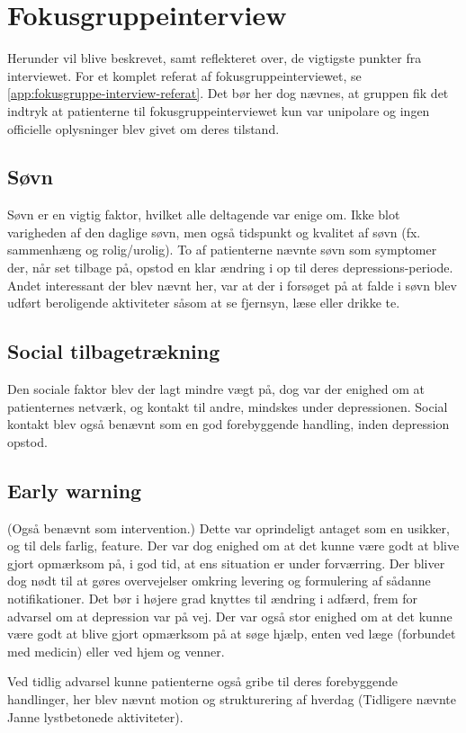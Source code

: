 \section{Fokusgruppeinterview}
Herunder vil blive beskrevet, samt reflekteret over, de vigtigste punkter fra interviewet.
For et komplet referat af fokusgruppeinterviewet, se \cref{app:fokusgruppe-interview-referat}.
Det bør her dog nævnes, at gruppen fik det indtryk at patienterne til fokusgruppeinterviewet kun var unipolare og ingen officielle oplysninger blev givet om deres tilstand.

\subsection{Søvn}
Søvn er en vigtig faktor, hvilket alle deltagende var enige om.
Ikke blot varigheden af den daglige søvn, men også tidspunkt og kvalitet af søvn (fx. sammenhæng og rolig/urolig).
To af patienterne nævnte søvn som symptomer der, når set tilbage på, opstod en klar ændring i op til deres depressions-periode.
Andet interessant der blev nævnt her, var at der i forsøget på at falde i søvn blev udført beroligende aktiviteter såsom at se fjernsyn, læse eller drikke te.

\subsection{Social tilbagetrækning}
Den sociale faktor blev der lagt mindre vægt på, dog var der enighed om at patienternes netværk, og kontakt til andre, mindskes under depressionen.
Social kontakt blev også benævnt som en god forebyggende handling, inden depression opstod.

\subsection{Early warning}
(Også benævnt som intervention.)
Dette var oprindeligt antaget som en usikker, og til dels farlig, feature.
Der var dog enighed om at det kunne være godt at blive gjort opmærksom på, i god tid, at ens situation er under forværring.
Der bliver dog nødt til at gøres overvejelser omkring levering og formulering af sådanne notifikationer.
Det bør i højere grad knyttes til ændring i adfærd, frem for advarsel om at depression var på vej.
Der var også stor enighed om at det kunne være godt at blive gjort opmærksom på at søge hjælp, enten ved læge (forbundet med medicin) eller ved hjem og venner.

Ved tidlig advarsel kunne patienterne også gribe til deres forebyggende handlinger, her blev nævnt motion og strukturering af hverdag 
(Tidligere nævnte Janne lystbetonede aktiviteter).

